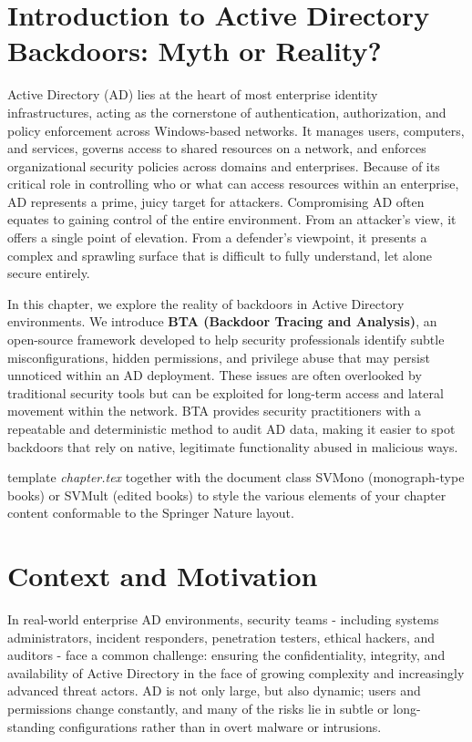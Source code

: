 \section{Introduction to Active Directory Backdoors: Myth or Reality?}
\label{sec:1}
Active Directory (AD) lies at the heart of most enterprise identity infrastructures, acting as the cornerstone of authentication, authorization, and policy enforcement across Windows-based networks. It manages users, computers, and services, governs access to shared resources on a network, and enforces organizational security policies across domains and enterprises. Because of its critical role in controlling who or what can access resources within an enterprise, AD represents a prime, juicy target for attackers. Compromising AD often equates to gaining control of the entire environment. From an attacker's view, it offers a single point of elevation. From a defender's viewpoint, it presents a complex and sprawling surface that is difficult to fully understand, let alone secure entirely.

In this chapter, we explore the reality of backdoors in Active Directory environments. We introduce \textbf{BTA (Backdoor Tracing and Analysis)}, an open-source framework developed to help security professionals identify subtle misconfigurations, hidden permissions, and privilege abuse that may persist unnoticed within an AD deployment. These issues are often overlooked by traditional security tools but can be exploited for long-term access and lateral movement within the network. BTA provides security practitioners with a repeatable and deterministic method to audit AD data, making it easier to spot backdoors that rely on native, legitimate functionality abused in malicious ways.

template \emph{chapter.tex} together with the document class SVMono (monograph-type books) or SVMult (edited books) to style the various elements of your chapter content conformable to the Springer Nature layout.

\section{Context and Motivation}
\label{sec:2}
In real-world enterprise AD environments, security teams - including systems administrators, incident responders, penetration testers, ethical hackers, and auditors - face a common challenge: ensuring the confidentiality, integrity, and availability of Active Directory in the face of growing complexity and increasingly advanced threat actors. AD is not only large, but also dynamic; users and permissions change constantly, and many of the risks lie in subtle or long-standing configurations rather than in overt malware or intrusions.

